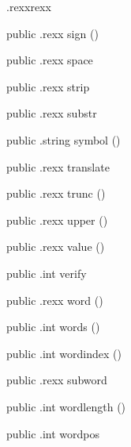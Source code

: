 \begin{CrexxClass}{.rexx}{rexx}
\begin{Members}
    \Method
      {public}
      {.rexx}
      {sign}
      {()}

    \Method
      {public}
      {.rexx}
      {space}
      {}

    \Method
      {public}
      {.rexx}
      {strip}
      {}

    \Method
      {public}
      {.rexx}
      {substr}
      {}

    \Method
      {public}
      {.string}
      {symbol}
      {()}

    \Method
      {public}
      {.rexx}
      {translate}
      {}

    \Method
      {public}
      {.rexx}
      {trunc}
      {()}

    \Method
      {public}
      {.rexx}
      {upper}
      {()}

    \Method
      {public}
      {.rexx}
      {value}
      {()}

    \Method
      {public}
      {.int}
      {verify}
      {}

    \Method
      {public}
      {.rexx}
      {word}
      {()}

    \Method
      {public}
      {.int}
      {words}
      {()}

    \Method
      {public}
      {.int}
      {wordindex}
      {()}

    \Method
      {public}
      {.rexx}
      {subword}
      {}

    \Method
      {public}
      {.int}
      {wordlength}
      {()}

    \Method
      {public}
      {.int}
      {wordpos}
      {}


\end{Members}
\end{CrexxClass}
